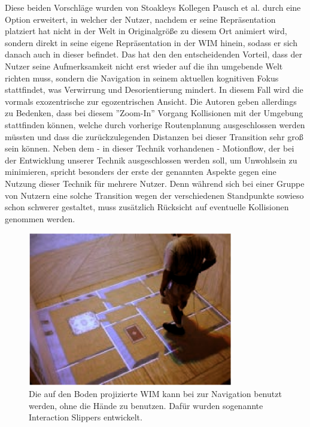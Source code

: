 Diese beiden Vorschläge wurden von Stoakleys Kollegen Pausch et al. \cite{5_pausch_WIM} durch eine Option erweitert, in welcher der Nutzer, nachdem er seine Repräsentation platziert hat nicht in der Welt in Originalgröße zu diesem Ort animiert wird, sondern direkt in seine eigene Repräsentation in der WIM hinein, sodass er sich danach auch in dieser befindet.
Das hat den den entscheidenden Vorteil, dass der Nutzer seine Aufmerksamkeit nicht erst wieder auf die ihn umgebende Welt richten muss, sondern die Navigation in seinem aktuellen kognitiven Fokus stattfindet, was Verwirrung und Desorientierung mindert. In diesem Fall wird die vormals exozentrische zur egozentrischen Ansicht.
Die Autoren geben allerdings zu Bedenken, dass bei diesem ”Zoom-In” Vorgang Kollisionen mit der Umgebung stattfinden können, welche durch vorherige Routenplanung ausgeschlossen werden müssten und dass die zurückzulegenden Distanzen bei dieser Transition sehr groß sein können. 
Neben dem - in dieser Technik vorhandenen - Motionflow, der bei der Entwicklung unserer Technik ausgeschlossen werden soll, um Unwohlsein zu minimieren, spricht besonders der erste der genannten Aspekte gegen eine Nutzung dieser Technik für mehrere Nutzer. Denn während sich bei einer Gruppe von Nutzern eine solche Transition wegen der verschiedenen Standpunkte sowieso schon schwerer gestaltet, muss zusätzlich Rücksicht auf eventuelle Kollisionen genommen werden.

\begin{figure}[h]
  \centering
  \includegraphics[width=0.8\textwidth]{images/step_wim.png}
  \caption{Die auf den Boden projizierte WIM kann bei \cite{LaViola2004Hands-freeEnvironments} zur Navigation benutzt werden, ohne die Hände zu benutzen. Dafür wurden sogenannte \glqq Interaction Slippers\grqq{} entwickelt.}
  \label{fig:todo}
\end{figure}

